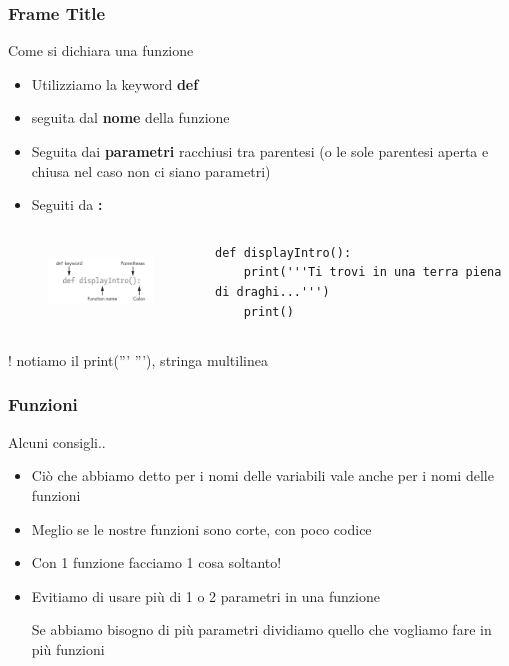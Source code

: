 \documentclass{beamer}
\begin{document}
\begin{frame}[fragile]
\frametitle{Frame Title}
        \begin{block}{Come si dichiara una funzione}
            \begin{itemize}
                \item Utilizziamo la keyword \textbf{def}
                \item seguita dal \textbf{nome} della funzione
                \item Seguita dai \textbf{parametri} racchiusi tra parentesi (o le sole parentesi aperta e chiusa nel caso non ci siano parametri)
                \item Seguiti da \textbf{:}
            \end{itemize}
        \end{block}

        \begin{columns}
	    \begin{column}{4cm}
			\begin{figure}
   				\includegraphics[height=2cm]{images/function_signature_example.png}
			\end{figure}
		\end{column}
		
		\begin{column}{6cm}
            \begin{lstlisting}
def displayIntro():
    print('''Ti trovi in una terra piena di draghi...''')
    print()
            \end{lstlisting}
		\end{column}
	\end{columns}
	! notiamo il print(''' '''), stringa multilinea
\end{frame}

\begin{frame}
\frametitle{Funzioni}
    \begin{block}{Alcuni consigli..}
        \begin{itemize}
            \item Ciò che abbiamo detto per i nomi delle variabili vale anche per i nomi delle funzioni
            \item Meglio se le nostre funzioni sono corte, con poco codice
            \item  Con 1 funzione facciamo 1 cosa soltanto!
            \item Evitiamo di usare più di 1 o 2 parametri in una funzione
            
            Se abbiamo bisogno di più parametri dividiamo quello che vogliamo fare in più funzioni
        \end{itemize}
    \end{block}
\end{frame}
\end{document}
